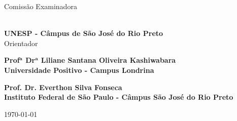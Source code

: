 	\begin{folhadeaprovacao}
	
	\begin{center}
		{\ABNTEXchapterfont\Large\imprimirautor}
		
		\vspace*{\fill}\vspace*{\fill}
		\begin{center}
			\ABNTEXchapterfont\LARGE\imprimirtitulo
		\end{center}
		\vspace*{\fill}
		
		\hspace{.45\textwidth}
			\begin{minipage}{.5\textwidth}
				\SingleSpacing
				\ABNTEXchapterfont\large\imprimirpreambulo
			\end{minipage}%
		\vspace*{\fill}
	\end{center}

	\begin{center}
		\ABNTEXchapterfont\Large Comissão Examinadora

		\normalsize{}
	\end{center}

	\ABNTEXchapterfont\large
	
	\par \noindent \textbf{\imprimirorientador \\ UNESP - Câmpus de São José do Rio Preto} \\ Orientador \\
	
	\par \noindent \textbf{Prof$\mathbf{^a}$ Dr$\mathbf{^a}$ Liliane Santana Oliveira Kashiwabara \\ Universidade Positivo - Campus Londrina} \\
	
	\par \noindent \textbf{Prof. Dr. Everthon Silva Fonseca \\ Instituto Federal de São Paulo - Câmpus São José do Rio Preto} 
	
	
	\ABNTEXchapterfont
	
	\begin{center}
		\vspace*{0.5cm}
		{\large\imprimirlocal}
		\par
		{\large\today}
		\par
		\vspace*{1cm}
	\end{center}
\end{folhadeaprovacao}
